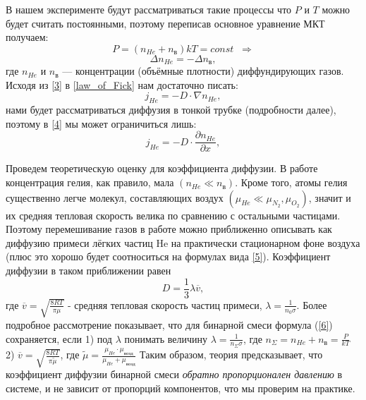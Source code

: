\documentclass[12 pt, a4paper]{article}%
\begin{document}
В нашем эксперименте будут рассматриваться такие процессы что $P$ и $T$ можно будет считать постоянными, поэтому переписав основное уравнение МКТ получаем: 
\begin{equation}\label{2}
    P = (n_{He} + n_в) k T = const \;\;\Rightarrow
\end{equation}
\begin{equation}\label{3}
    \Delta n_{He} = - \Delta n_в,
\end{equation}
где $n_{He}$ и $n_в$ — концентрации (объёмные плотности) диффундирующих газов. Исходя из \ref{3} в \ref{law_of_Fick} нам достаточно писать: \\
\begin{equation} \label{4}
    j_{He} = - D \cdot \nabla n_{He},
\end{equation} 
нами будет рассматриваться диффузия в тонкой трубке (подробности далее), поэтому в \ref{4} мы может ограничиться лишь: 
\begin{equation} \label{5}
    j_{He} = - D \cdot \frac{\partial n_{He}}{\partial x},
\end{equation}\newpage

Проведем теоретическую оценку для коэффициента диффузии. В работе концентрация гелия, как правило, мала $(n_{He} \ll n_в)$. Кроме того, атомы гелия существенно легче молекул, составляющих воздух $(\mu_{He} \ll \mu_{N_2} , \mu_{O_2})$, значит и их средняя тепловая скорость велика по сравнению с остальными частицами. Поэтому перемешивание газов в работе можно приближенно описывать как диффузию примеси лёгких частиц He на практически стационарном фоне воздуха (плюс это хорошо будет соотноситься на формулах вида \ref{5}). Коэффициент диффузии в таком приближении равен
\begin{equation}\label{6}
    D = \frac{1}{3} \lambda \overline{v},
\end{equation}
где $\overline{v} = \sqrt{\frac{8RT}{\pi \mu}}$ - средняя тепловая скорость частиц примеси, $\lambda = \frac{1}{n_0 \sigma}$. Более подробное рассмотрение показывает, что для бинарной смеси формула (\ref{6}) сохраняется, если 1) под $\lambda$ понимать величину $\lambda = \frac{1}{n_\Sigma \sigma}$, где $n_\Sigma = n_{He} + n_в = \frac{P}{kT}$ 2) $\overline{v} = \sqrt{\frac{8RT}{\pi \widetilde{\mu}}}$, где $\widetilde{\mu} = \frac{\mu_{He}\cdot\mu_{возд}}{\mu_{He}+\mu_{возд}}$  Таким образом, теория предсказывает, что коэффициент диффузии бинарной смеси \textit{обратно пропорционален давлению} в системе, и не зависит от пропорций компонентов, что мы проверим на практике.
\end{document}
